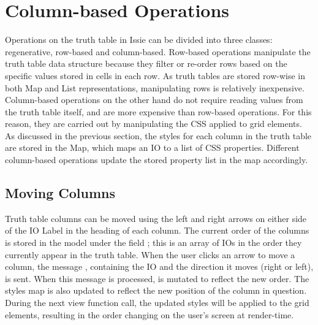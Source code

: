 \section{Column-based Operations}
Operations on the truth table in Issie can be divided into three classes: regenerative, row-based and column-based. Row-based operations manipulate the truth table data structure because they filter or re-order rows based on the specific values stored in cells in each row. As truth tables are stored row-wise in both Map and List representations, manipulating rows is relatively inexpensive. Column-based operations on the other hand do not require reading values from the truth table itself, and are more expensive than row-based operations. For this reason, they are carried out by manipulating the CSS applied to grid elements. As discussed in the previous section, the styles for each column in the truth table are stored in the  Map, which maps an IO to a list of CSS properties. Different column-based operations update the stored property list in the map accordingly. 

\subsection{Moving Columns}
Truth table columns can be moved using the left and right arrows on either side of the IO Label in the heading of each column. The current order of the columns is stored in the model under the field ; this is an array of IOs in the order they currently appear in the truth table. When the user clicks an arrow to move a column, the message , containing the IO and the direction it moves (right or left), is sent. When this message is processed,  is mutated to reflect the new order. The styles map  is also updated to reflect the new position of the column in question. During the next view function call, the updated styles will be applied to the grid elements, resulting in the order changing on the user's screen at render-time.

